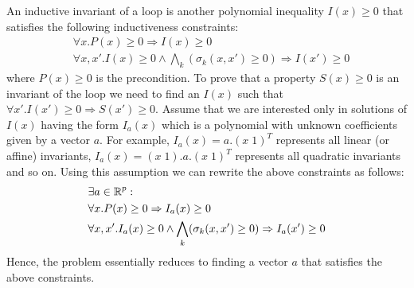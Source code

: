 An inductive invariant of a loop is another polynomial inequality $I(x) \ge 0$ 
that satisfies the following inductiveness constraints:
%
\begin{align}
& \forall x. P(x) \ge 0 \Rightarrow I(x) \ge 0 \\
& \forall x,x'. I(x) \ge 0 \wedge \bigwedge_k (\sigma_k(x,x') \ge 0) \Rightarrow  I(x') \ge 0
\end{align}
%
where $P(x) \ge 0$ is the precondition.
To prove that a property $S(x) \ge 0$ is an invariant of the loop we need to find an $I(x)$ such that
$\forall x'. I(x') \ge 0 \Rightarrow S(x') \ge 0$.
Assume that we are interested only in solutions of $I(x)$ having the form $I_a(x)$ which is a polynomial with 
unknown coefficients given by a vector $a$. 
For example, $I_a(x) = a.(x \; 1)^T$ represents all linear (or affine) invariants, 
$I_a(x) = (x \; 1).a.(x \; 1)^T$ represents all quadratic invariants  and so on. 
Using this assumption we can rewrite the above constraints as follows:
%
\begin{align}
& \nonumber \exists a \in \real^p:  \\
& \forall x. P(x) \ge 0 \Rightarrow I_a(x) \ge 0  \label{eq:template1}\\
& \forall x,x'. I_a(x) \ge 0  \wedge \bigwedge_k (\sigma_k(x,x') \ge 0) \Rightarrow  I_a(x') \ge 0 \label{eq:template2}
\end{align}
%
Hence,  the problem essentially reduces to finding a vector $a$ that satisfies
the above constraints.

